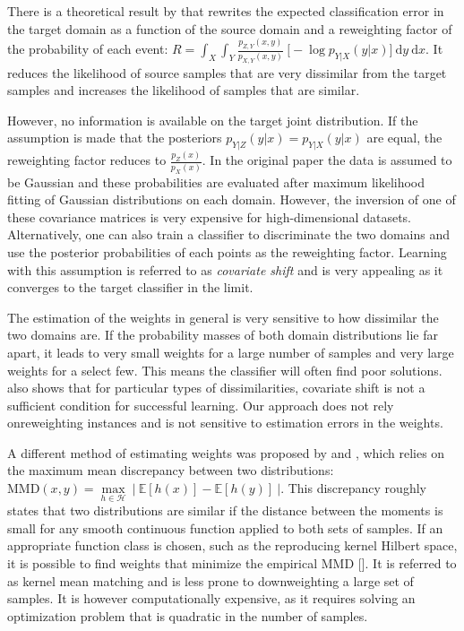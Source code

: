 \documentclass[twoside,11pt]{article}
\begin{document}

There is a theoretical result by \cite{shimodaira2000improving} that rewrites the expected classification error in the target domain as a function of the source domain and a reweighting factor of the probability of each event: $R= \int_{X} \int_{Y} \frac{p_{Z,Y}(x,y)}{p_{X,Y}(x,y)} \ \big[-\log p_{Y|X}(y|x)\big] \ \mathrm{d}y \ \mathrm{d}x$. It reduces the likelihood of source samples that are very dissimilar from the target samples and increases the likelihood of samples that are similar. 

However, no information is available on the target joint distribution. If the assumption is made that the posteriors $p_{Y|Z}(y|x)=p_{Y|X}(y|x)$ are equal, the reweighting factor reduces to $\frac{p_{Z}(x)}{p_{X}(x)}$. In the original paper the data is assumed to be Gaussian and these probabilities are evaluated after maximum likelihood fitting of Gaussian distributions on each domain. However, the inversion of one of these covariance matrices is very expensive for high-dimensional datasets. Alternatively, one can also train a classifier to discriminate the two domains and use the posterior probabilities of each points as the reweighting factor. Learning with this assumption is referred to as \emph{covariate shift} and is very appealing as it converges to the target classifier in the limit.

The estimation of the weights in general is very sensitive to how dissimilar the two domains are. If the probability masses of both domain distributions lie far apart, it leads to very small weights for a large number of samples and very large weights for a select few. This means the classifier will often find poor solutions. \cite{ben2010impossibility} also shows that for particular types of dissimilarities, covariate shift is not a sufficient condition for successful learning. Our approach does not rely onreweighting instances and is not sensitive to estimation errors in the weights.

A different method of estimating weights was proposed by \cite{huang2007correcting} and \cite{gretton2009covariate}, which relies on the maximum mean discrepancy between two distributions: $\text{MMD}(x,y) = \underset{h \in \mathcal{H}}{\max} \ | \ \mathbb{E}[h(x)] - \mathbb{E}[h(y)] \ |$. This discrepancy roughly states that two distributions are similar if the distance between the moments is small for any smooth continuous function applied to both sets of samples. If an appropriate function class is chosen, such as the reproducing kernel Hilbert space, it is possible to find weights that minimize the empirical MMD [\cite{borgwardt2006integrating}]. It is referred to as kernel mean matching and is less prone to downweighting a large set of samples. It is however computationally expensive, as it requires solving an optimization problem that is quadratic in the number of samples. 
\end{document}
